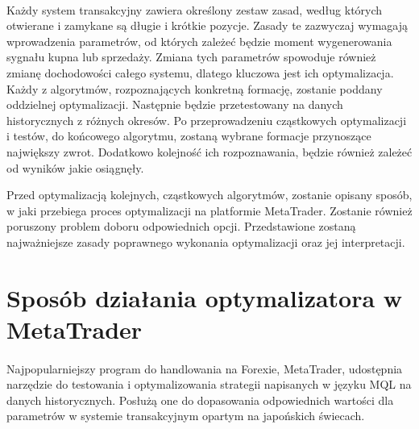 \documentclass[pdflatex,11pt]{aghdpl}
\begin{document}
\paragraph{}
Każdy system transakcyjny zawiera określony zestaw zasad, według których otwierane i zamykane są długie i krótkie pozycje. Zasady te zazwyczaj wymagają wprowadzenia parametrów, od których zależeć będzie moment wygenerowania sygnału kupna lub sprzedaży. Zmiana tych parametrów spowoduje również zmianę dochodowości całego systemu, dlatego kluczowa jest ich optymalizacja. Każdy z algorytmów, rozpoznających konkretną formację, zostanie poddany oddzielnej optymalizacji. Następnie będzie przetestowany na danych historycznych z różnych okresów. Po przeprowadzeniu cząstkowych optymalizacji i testów, do końcowego algorytmu, zostaną wybrane formacje przynoszące największy zwrot. Dodatkowo kolejność ich rozpoznawania, będzie również zależeć od wyników jakie osiągnęły. 

Przed optymalizacją kolejnych, cząstkowych algorytmów, zostanie opisany sposób, w jaki przebiega proces optymalizacji na platformie MetaTrader. Zostanie również poruszony problem doboru odpowiednich opcji. Przedstawione zostaną najważniejsze zasady poprawnego wykonania optymalizacji oraz jej interpretacji. 

\section{Sposób działania optymalizatora w MetaTrader}
\paragraph{}

Najpopularniejszy program do handlowania na Forexie, MetaTrader, udostępnia narzędzie do testowania i optymalizowania strategii napisanych w języku MQL na danych historycznych. Posłużą one do dopasowania odpowiednich wartości dla parametrów w systemie transakcyjnym opartym na japońskich świecach.
\end{document}
